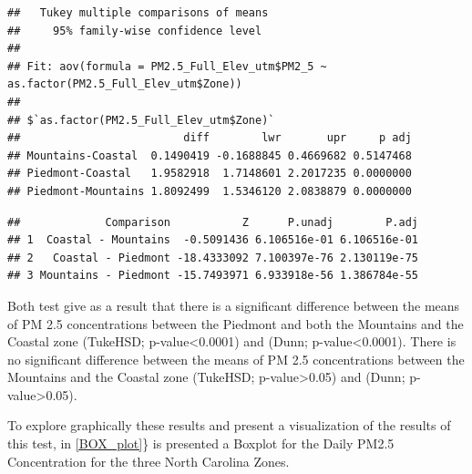 \documentclass[12pt,]{article}
\newenvironment{Shaded}{\begin{snugshade}}{\end{snugshade}}
\newcommand{\KeywordTok}[1]{\textcolor[rgb]{0.13,0.29,0.53}{\textbf{#1}}}
\newcommand{\DecValTok}[1]{\textcolor[rgb]{0.00,0.00,0.81}{#1}}
\newcommand{\StringTok}[1]{\textcolor[rgb]{0.31,0.60,0.02}{#1}}
\newcommand{\OperatorTok}[1]{\textcolor[rgb]{0.81,0.36,0.00}{\textbf{#1}}}
\newcommand{\NormalTok}[1]{#1}
\begin{document}
\begin{verbatim}
##   Tukey multiple comparisons of means
##     95% family-wise confidence level
## 
## Fit: aov(formula = PM2.5_Full_Elev_utm$PM2_5 ~ as.factor(PM2.5_Full_Elev_utm$Zone))
## 
## $`as.factor(PM2.5_Full_Elev_utm$Zone)`
##                         diff        lwr       upr     p adj
## Mountains-Coastal  0.1490419 -0.1688845 0.4669682 0.5147468
## Piedmont-Coastal   1.9582918  1.7148601 2.2017235 0.0000000
## Piedmont-Mountains 1.8092499  1.5346120 2.0838879 0.0000000
\end{verbatim}

\begin{Shaded}
\end{Shaded}

\begin{verbatim}
##             Comparison           Z      P.unadj        P.adj
## 1  Coastal - Mountains  -0.5091436 6.106516e-01 6.106516e-01
## 2   Coastal - Piedmont -18.4333092 7.100397e-76 2.130119e-75
## 3 Mountains - Piedmont -15.7493971 6.933918e-56 1.386784e-55
\end{verbatim}

Both test give as a result that there is a significant difference
between the means of PM 2.5 concentrations between the Piedmont and both
the Mountains and the Coastal zone (TukeHSD; p-value\textless{}0.0001)
and (Dunn; p-value\textless{}0.0001). There is no significant difference
between the means of PM 2.5 concentrations between the Mountains and the
Coastal zone (TukeHSD; p-value\textgreater{}0.05) and (Dunn;
p-value\textgreater{}0.05).

To explore graphically these results and present a visualization of the
results of this test, in \autoref{BOX_plot}\} is presented a Boxplot for
the Daily PM2.5 Concentration for the three North Carolina Zones.
\end{document}
